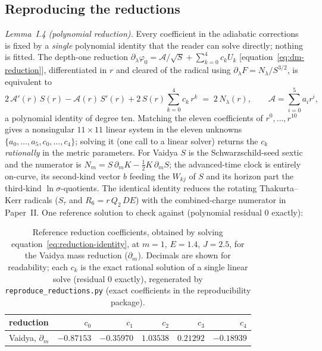 \documentclass[12pt]{iopart}
\begin{document}
\subsection{Reproducing the reductions}
\label{app:reproduce}
\emph{Lemma~I.4 (polynomial reduction).} Every coefficient in the adiabatic corrections is fixed by a \emph{single} polynomial identity that the reader can solve directly; nothing is fitted. The
depth-one reduction $\partial_\lambda\varphi_0=\mathcal{A}/\sqrt S+\sum_{k=0}^4 c_k
U_k$ [equation~\eqref{eq:dm-reduction}], differentiated in $r$ and
cleared of the radical using $\partial_\lambda F=N_\lambda/S^{3/2}$, is equivalent to
\begin{equation}
    2\,\mathcal{A}'(r)\,S(r)-\mathcal{A}(r)\,S'(r)
    +2\,S(r)\sum_{k=0}^4 c_k\,r^k \;=\; 2\,N_\lambda(r),
    \qquad \mathcal{A}=\sum_{i=0}^5 a_i r^i,
    \label{eq:reduction-identity}
\end{equation}
a polynomial identity of degree ten. Matching the eleven coefficients of
$r^0,\dots,r^{10}$ gives a nonsingular $11\times11$ linear system in the eleven
unknowns $\{a_0,\dots,a_5,c_0,\dots,c_4\}$; solving it (one call to a linear solver)
returns the $c_k$ \emph{rationally} in the metric parameters. For Vaidya $S$ is the
Schwarzschild-seed sextic and the numerator is
$N_m=S\,\partial_m K-\tfrac12K\,\partial_m S$; the advanced-time clock is entirely
on-curve, its second-kind vector $b$ feeding the $W_{kj}$ of $S$ and its horizon part the
third-kind $\ln\sigma$-quotients. The identical identity reduces the rotating
Thakurta--Kerr radicals ($S_\tau$ and $R_6=r\,Q_2\,DE$) with the combined-charge
numerator in Paper~II. One reference solution to check against (polynomial residual $0$
exactly):
\begin{table}[htbp]
    \centering
    \caption{Reference reduction coefficients, obtained by solving
    equation~\eqref{eq:reduction-identity}, at $m{=}1$, $E{=}1.4$, $J{=}2.5$, for the Vaidya
    mass reduction ($\partial_m$). Decimals are shown for readability; each $c_k$ is the
    exact rational solution of a single linear solve (residual $0$ exactly), regenerated
    by \texttt{reproduce\_reductions.py} (exact coefficients in the reproducibility
    package).}
    \label{tab:reduction-ck}
    \small
    \begin{tabular}{lrrrrr}
        \hline\hline
        reduction & $c_0$ & $c_1$ & $c_2$ & $c_3$ & $c_4$\\
        \hline
        Vaidya, $\partial_m$ & $-0.87153$ & $-0.35970$ & $1.03538$ & $0.21292$ & $-0.18939$\\
        \hline\hline
    \end{tabular}
\end{table}
\end{document}

